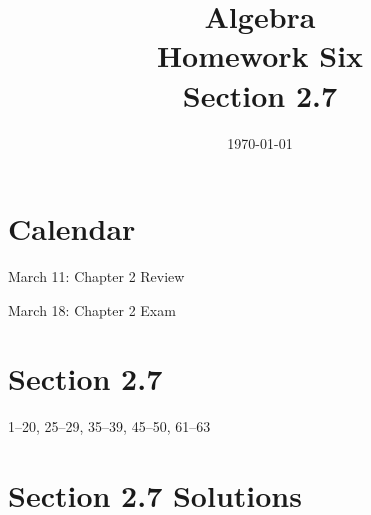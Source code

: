 \documentclass[letterpaper]{exam}
\title{Algebra \\ Homework Six \\ Section 2.7 }
\author{}
\date{\today}
\begin{document}
  \maketitle

  \section{Calendar}

  \begin{itemize*}
    \item March 11: Chapter 2 Review
    \item March 18: Chapter 2 Exam
  \end{itemize*}

  \section{Section 2.7}
  1--20, 25--29, 35--39, 45--50, 61--63

  \ifprintanswers{}

    \section{Section 2.7 Solutions} 
\end{document}
